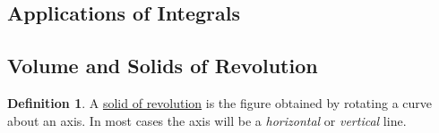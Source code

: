 \documentclass[12pt]{article}
\theoremstyle{plain}
\theoremstyle{definition}
\newtheorem*{Def}{Definition}       %
\theoremstyle{remark}
\renewcommand{\:}{\colon}           %
\newcommand{\un}[1]{\underline{#1}}
\renewcommand{\.}{\Cdot}                %
\begin{document}
\begin{multicols}{2}
\section*{Applications of Integrals}

\subsection*{Volume and Solids of Revolution}

\begin{Def}
A \un{solid of revolution} is the figure obtained by rotating a curve about an axis. In most cases the axis will be a \emph{horizontal} or \emph{vertical} line.
\end{Def}

\begin{center}
  


\begin{tikzpicture}[x=0.51pt,y=0.51pt,yscale=-1,xscale=1]


\end{tikzpicture}
\end{center}
\end{multicols}
\end{document}
